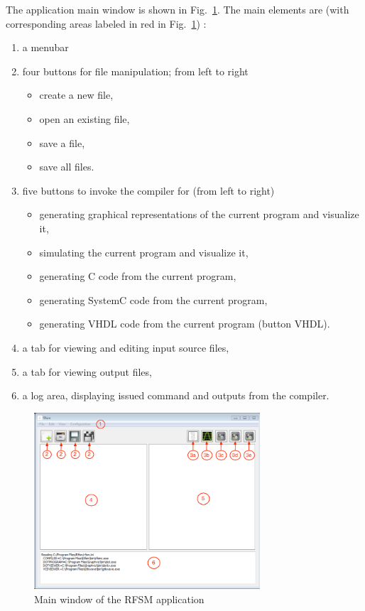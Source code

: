 
\medskip
The application main window is shown in Fig.~\ref{fig:main-window}. 
The main elements are (with corresponding areas labeled in red in Fig.~\ref{fig:main-window}) :
\begin{enumerate}
\item a menubar
\item four buttons for file manipulation; from left to right
  \begin{itemize}
  \item create a new file,
  \item open an existing file,
  \item save a file,
  \item save all files.
  \end{itemize}
\item five buttons to invoke the compiler for (from left to right)
  \begin{itemize}
  \item generating graphical representations of the current program and visualize it,
  \item simulating the current program and visualize it,
  \item generating C code from the current program,
  \item generating SystemC code from the current program,
  \item generating VHDL code from the current program (button \textsc{VHDL}).
  \end{itemize}
\item a tab for viewing and editing input source files,
\item a tab for viewing output files,
\item a log area, displaying issued command and outputs from the compiler.
\end{enumerate}

\begin{figure}[h]
  \centering
  \includegraphics[width=0.75\textwidth]{figs/gui/mainwindow}
  \caption{Main window of the RFSM application}
  \label{fig:main-window}
\end{figure}

